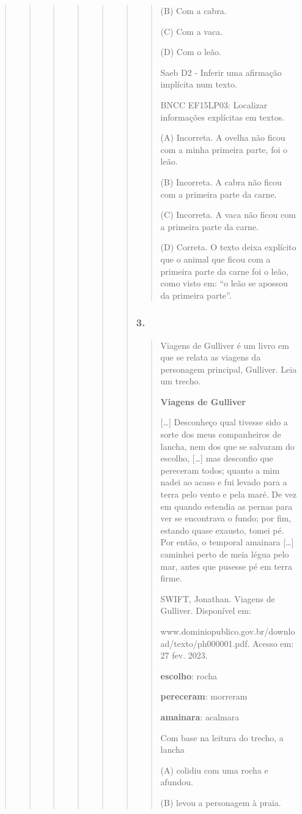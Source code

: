 \begin{quote}
\begin{quote}
\begin{quote}
\begin{quote}
\begin{quote}
\begin{quote}
\begin{quote}
(B) Com a cabra.

(C) Com a vaca.

(D) Com o leão.

Saeb D2 - Inferir uma afirmação implícita num texto.

BNCC EF15LP03: Localizar informações explícitas em textos.

(A) Incorreta. A ovelha não ficou com a minha primeira parte, foi o
leão.

(B) Incorreta. A cabra não ficou com a primeira parte da carne.

(C) Incorreta. A vaca não ficou com a primeira parte da carne.

(D) Correta. O texto deixa explícito que o animal que ficou com a
primeira parte da carne foi o leão, como visto em: ``o leão se apossou
da primeira parte''.
\end{quote}

\subsubsection{3. }\label{section-82}

\begin{quote}
Viagens de Gulliver é um livro em que se relata as viagens da personagem
principal, Gulliver. Leia um trecho.

\textbf{Viagens de Gulliver}

{[}\ldots{}{]} Desconheço qual tivesse sido a sorte dos meus
companheiros de lancha, nem dos que se salvaram do escolho,
{[}\ldots{}{]} mas desconfio que pereceram todos; quanto a mim nadei ao
acaso e fui levado para a terra pelo vento e pela maré. De vez em quando
estendia as pernas para ver se encontrava o fundo; por fim, estando
quase exausto, tomei pé. Por então, o temporal amainara {[}\ldots{}{]}
caminhei perto de meia légua pelo mar, antes que pusesse pé em terra
firme.

SWIFT, Jonathan. Viagens de Gulliver. Disponível em:

www.dominiopublico.gov.br/download/texto/ph000001.pdf. Acesso em: 27
fev. 2023.

\textbf{escolho}: rocha

\textbf{pereceram}: morreram

\textbf{amainara}: acalmara

Com base na leitura do trecho, a lancha

(A) colidiu com uma rocha e afundou.

(B) levou a personagem à praia.


\end{quote}
\end{quote}
\end{quote}
\end{quote}
\end{quote}
\end{quote}
\end{quote}
